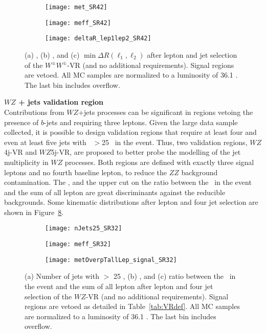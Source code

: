\begin{figure}[htb!]
\centering
\begin{subfigure}[t]{0.49\textwidth}
\texttt{[image: met\_SR42]}
\subcaption{}
\label{fig:wwa}
\end{subfigure}
\begin{subfigure}[t]{0.49\textwidth}
\texttt{[image: meff\_SR42]}
\subcaption{}
\label{fig:wwb}
\end{subfigure}
\begin{subfigure}[t]{0.49\textwidth}
\texttt{[image: deltaR\_lep1lep2\_SR42]}
\subcaption{}
\label{fig:wwc}
\end{subfigure}
\caption{(a) \met, (b) \meff, and (c) $\operatorname{min}\Delta R (\ell_{1}, \ell_2)$ after lepton and jet selection of the $W^\pm W^\pm$-VR (and no additional requirements). Signal regions are vetoed. All MC samples are normalized to a luminosity of 36.1 \ifb. The last bin includes overflow.
}
\label{fig:WW_VR_afterLepJetSel}
\end{figure} 


\par{\bf $WZ$ + jets validation region\\}
Contributions from $WZ$+jets processes can be significant in regions vetoing the presence of $b$-jets and requiring three leptons. 
Given the large data sample collected, it is possible to design validation 
regions that require at least four and even at least five jets with \pt~$>$25 \GeV~in the event. Thus, two validation regions, $WZ$4j-VR and $WZ$5j-VR, are proposed to better probe the modelling of the jet multiplicity in $WZ$ processes. Both regions are defined with exactly three signal leptons and no fourth baseline lepton, to reduce the $ZZ$ background contamination. The \meff, and the upper cut on the ratio between the \met\ in the event and the sum of all lepton \pt are great discriminants against the reducible backgrounds. Some kinematic distributions after lepton and four jet selection are shown in Figure~\ref{fig:WZ_VR_afterLepJetSel}.

\begin{figure}[htb!]
\centering
\begin{subfigure}[t]{0.49\textwidth}
\texttt{[image: nJets25\_SR32]}
\subcaption{}\label{fig:wza}\end{subfigure}
\begin{subfigure}[t]{0.49\textwidth}
\texttt{[image: meff\_SR32]}
\subcaption{}\label{fig:wzb}\end{subfigure}
\begin{subfigure}[t]{0.49\textwidth}
\texttt{[image: metOverpTallLep\_signal\_SR32]}
\subcaption{}\label{fig:wzc}\end{subfigure}
\caption{(a) Number of jets with \pt $>$ 25 \GeV, (b) \meff, and (c) ratio between the \met\ in the event and the sum of all lepton \pt after lepton and four jet selection of the $WZ$-VR (and no additional requirements). Signal regions are vetoed as detailed in Table~\ref{tab:VRdef}. All MC samples are normalized to a luminosity of 36.1 \ifb. The last bin includes overflow.
}
\label{fig:WZ_VR_afterLepJetSel}
\end{figure} 

